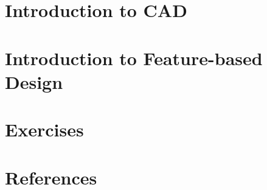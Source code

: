 \section[CAD]{Introduction to CAD}


\section[FBD]{Introduction to Feature-based Design}


\section[EXR]{Exercises}


\section[Refs]{References}
